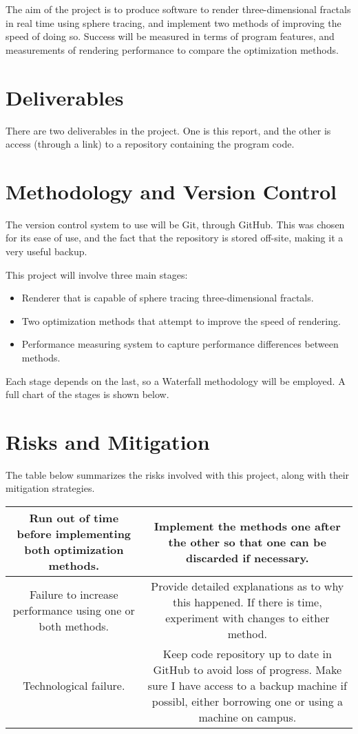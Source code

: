 The aim of the project is to produce software to render three-dimensional fractals in real time using sphere tracing, and implement two methods of improving the speed of doing so. Success will be measured in terms of program features, and measurements of rendering performance to compare the optimization methods.

\section{Deliverables}

There are two deliverables in the project. One is this report, and the other is access (through a link) to a repository containing the program code.

\section{Methodology and Version Control}

The version control system to use will be Git, through GitHub. This was chosen for its ease of use, and the fact that the repository is stored off-site, making it a very useful backup.\newline

This project will involve three main stages:

\begin{itemize}
	\item Renderer that is capable of sphere tracing three-dimensional fractals.
	\item Two optimization methods that attempt to improve the speed of rendering.
	\item Performance measuring system to capture performance differences between methods.
\end{itemize}

Each stage depends on the last, so a Waterfall methodology will be employed. A full chart of the stages is shown below.

\section{Risks and Mitigation}

The table below summarizes the risks involved with this project, along with their mitigation strategies.

\begin{tabular}{||c|c||}
	\hline
	\hline
	Run out of time before implementing both optimization methods. & Implement the methods one after the other so that one can be discarded if necessary.\\
	\hline
	Failure to increase performance using one or both methods. & Provide detailed explanations as to why this happened. If there is time, experiment with changes to either method.\\
	\hline
	Technological failure. & Keep code repository up to date in GitHub to avoid loss of progress. Make sure I have access to a backup machine if possibl, either borrowing one or using a machine on campus.\\
	\hline
	\hline
\end{tabular}

